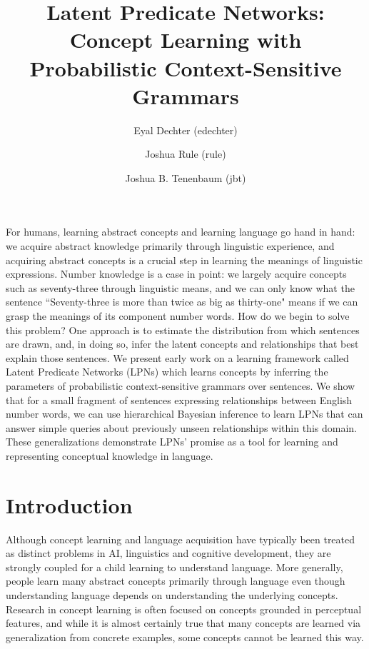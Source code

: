 \documentclass[10pt, twocolumn]{article}
\title{Latent Predicate Networks: Concept Learning with Probabilistic Context-Sensitive Grammars}
\author{Eyal Dechter (edechter)}
\author{Joshua Rule (rule)}
\author{Joshua B. Tenenbaum (jbt)}
\affil{Department of Brain and Cognitive Sciences, MIT (mit.edu)}
\date{}
\begin{document}
\vspace{-10cm}
\maketitle
\vspace{-4em}

{\small For humans, learning abstract concepts and learning language
  go hand in hand: we acquire abstract knowledge primarily through
  linguistic experience, and acquiring abstract concepts is a crucial
  step in learning the meanings of linguistic expressions. Number
  knowledge is a case in point: we largely acquire concepts such as
  seventy-three through linguistic means, and we can only know what
  the sentence ``Seventy-three is more than twice as big as
  thirty-one" means if we can grasp the meanings of its component
  number words. How do we begin to solve this problem? One approach is
  to estimate the distribution from which sentences are drawn, and, in
  doing so, infer the latent concepts and relationships that best
  explain those sentences. We present early work on a learning
  framework called Latent Predicate Networks (LPNs) which learns
  concepts by inferring the parameters of probabilistic
  context-sensitive grammars over sentences.  We show that for a small
  fragment of sentences expressing relationships between English
  number words, we can use hierarchical Bayesian inference to learn
  LPNs that can answer simple queries about previously unseen
  relationships within this domain. These generalizations demonstrate
  LPNs' promise as a tool for learning and representing conceptual
  knowledge in language.}

\section{Introduction}

Although concept learning and language acquisition have typically been
treated as distinct problems in AI, linguistics and cognitive
development, they are strongly coupled for a child learning to
understand language. More generally, people learn many abstract
concepts primarily through language even though understanding language
depends on understanding the underlying concepts. Research in concept
learning is often focused on concepts grounded in perceptual features,
and while it is almost certainly true that many concepts are learned
via generalization from concrete examples, some concepts cannot be
learned this way.
\end{document}
